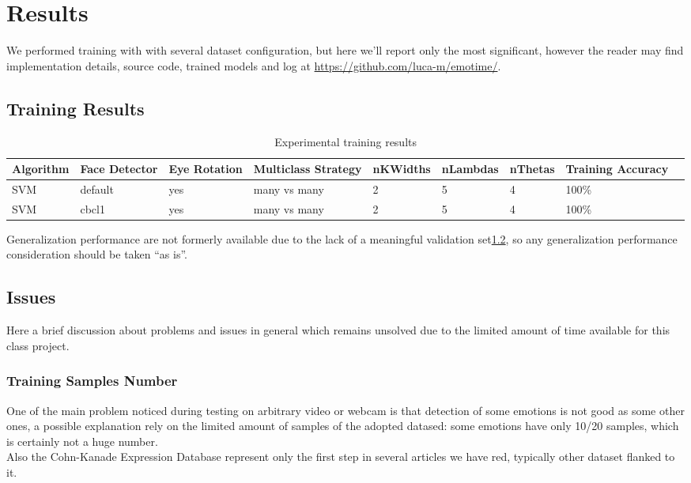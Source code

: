 \section{Results}

We performed training with with several dataset configuration, but here we'll report only the most significant, however the reader may find implementation details, source code, trained models and log at \url{https://github.com/luca-m/emotime/}.

\subsection{Training Results}

\begin{table}[htb]
\scriptsize
\begin{tabular}{|p{2cm}|p{1.5cm}|p{1.5cm}|p{1.5cm}|p{1.5cm}|p{1.5cm}|p{1.5cm}|p{1.5cm}|p{1.5cm}|}
\hline
{\bf Algorithm }& {\bf Face Detector }& {\bf Eye Rotation}& {\bf Multiclass Strategy } & {\bf nKWidths} & {\bf nLambdas} & {\bf nThetas} &  {\bf Training Accuracy}\\ 
\hline
SVM & default & yes & many vs many & 2 & 5 & 4 & 100\% \\
\hline 
SVM & cbcl1   & yes & many vs many & 2 & 5 & 4 & 100\% \\
\hline 
\end{tabular}
\label{tab:train}
\caption{Experimental training results}
\end{table}

Generalization performance are not formerly available due to the lack of a meaningful validation set\ref{res:issues}, so any generalization performance consideration should be taken ``as is''.

\subsection{Issues}
\label{res:issues}

Here a brief discussion about problems and issues in general which remains unsolved due to the limited amount of time available for this class project.

\subsubsection*{Training Samples Number}

One of the main problem noticed during testing on arbitrary video or webcam is that detection of some emotions is not good as some other ones, a possible explanation rely on the limited amount of samples of the adopted datased: some emotions have only 10/20 samples, which is certainly not a huge number.\\
Also the Cohn-Kanade Expression Database represent only the first step in several articles we have red, typically other dataset flanked to it. 

